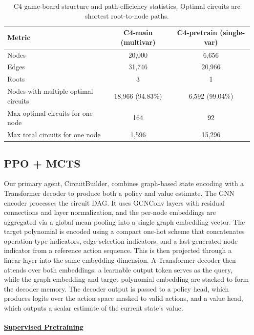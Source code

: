 \documentclass{article} %
\begin{document}
\begin{table}[t]
\centering
\small
\begin{tabular}{lcc}
\toprule
Metric & C4-main (multivar) & C4-pretrain (single-var) \\
\midrule
Nodes & 20{,}000 & 6{,}656 \\
Edges & 31{,}746 & 20{,}966 \\
Roots & 3 & 1 \\
Nodes with multiple optimal circuits & 18{,}966 (94.83\%) & 6{,}592 (99.04\%) \\
Max optimal circuits for one node & 164 & 92 \\
Max total circuits for one node & 1{,}596 & 15{,}296 \\
\bottomrule
\end{tabular}
\caption{C4 game-board structure and path-efficiency statistics. Optimal circuits are shortest root-to-node paths.}
\label{tab:c4_summary}
\end{table}

\subsection{PPO + MCTS}

Our primary agent, CircuitBuilder, combines graph-based state encoding with a Transformer decoder to produce both a policy and value estimate. The GNN encoder processes the circuit DAG. It uses GCNConv layers with residual connections and layer normalization, and the per-node embeddings are aggregated via a global mean pooling into a single graph embedding vector. The target polynomial is encoded using a compact one-hot scheme that concatenates operation-type indicators, edge-selection indicators, and a last-generated-node indicator from a reference action sequence. This is then projected through a linear layer into the same embedding dimension. A Transformer decoder then attends over both embeddings: a learnable output token serves as the query, while the graph embedding and target polynomial embedding are stacked to form the decoder memory. The decoder output is passed to a policy head, which produces logits over the action space masked to valid actions, and a value head, which outputs a scalar estimate of the current state's value.

\paragraph{\underline{Supervised Pretraining}}
\end{document}
